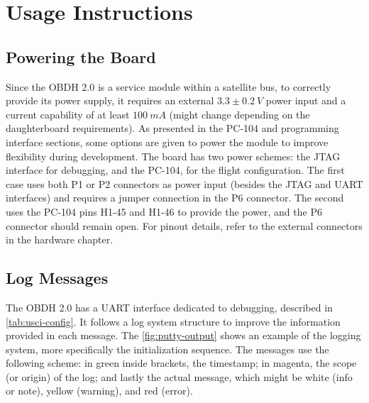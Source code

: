 %
%
%
%
%

%
%
%
%
%
%

\chapter{Usage Instructions} \label{ch:instructions}

\section{Powering the Board}

Since the OBDH 2.0 is a service module within a satellite bus, to correctly provide its power supply, it requires an external $3.3\pm0.2\ V$ power input and a current capability of at least $100\ mA$ (might change depending on the daughterboard requirements). As presented in the PC-104 and programming interface sections, some options are given to power the module to improve flexibility during development. The board has two power schemes: the JTAG interface for debugging, and the PC-104, for the flight configuration. The first case uses both P1 or P2 connectors as power input (besides the JTAG and UART interfaces) and requires a jumper connection in the P6 connector. The second uses the PC-104 pins H1-45 and H1-46 to provide the power, and the P6 connector should remain open. For pinout details, refer to the external connectors in the hardware chapter.

\section{Log Messages}

The OBDH 2.0 has a UART interface dedicated to debugging, described in \autoref{tab:usci-config}. It follows a log system structure to improve the information provided in each message. The \autoref{fig:putty-output} shows an example of the logging system, more specifically the initialization sequence. The messages use the following scheme: in green inside brackets, the timestamp; in magenta, the scope (or origin) of the log; and lastly the actual message, which might be white (info or note), yellow (warning), and red (error).

